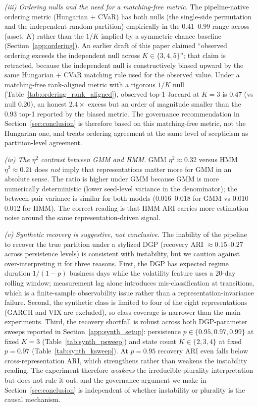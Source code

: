 \documentclass[preprint,12pt,authoryear]{elsarticle}
\begin{document}
\emph{(iii) Ordering nulls and the need for a matching-free metric.} The pipeline-native ordering metric (Hungarian + CVaR) has both nulls (the single-side permutation and the independent-random-partition) empirically in the $0.41$--$0.99$ range across (asset, $K$) rather than the $1/K$ implied by a symmetric chance baseline (Section~\ref{app:ordering}). An earlier draft of this paper claimed ``observed ordering exceeds the independent null across $K\in\{3,4,5\}$''; that claim is retracted, because the independent null is constructively biased upward by the same Hungarian + CVaR matching rule used for the observed value. Under a matching-free rank-aligned metric with a rigorous $1/K$ null (Table~\ref{tab:ordering_rank_aligned}), observed top-1 Jaccard at $K=3$ is $0.47$ (vs null $0.20$), an honest $2.4\times$ excess but an order of magnitude smaller than the $0.93$ top-1 reported by the biased metric. The governance recommendation in Section~\ref{sec:conclusion} is therefore based on this matching-free metric, not the Hungarian one, and treats ordering agreement at the same level of scepticism as partition-level agreement.

\emph{(iv) The $\eta^2$ contrast between GMM and HMM.} GMM $\eta^2 \approx 0.32$ versus HMM $\eta^2 \approx 0.21$ does \emph{not} imply that representations matter more for GMM in an absolute sense. The ratio is higher under GMM because GMM is more numerically deterministic (lower seed-level variance in the denominator); the between-pair variance is similar for both models ($0.016$--$0.018$ for GMM vs $0.010$--$0.012$ for HMM). The correct reading is that HMM ARI carries more estimation noise around the same representation-driven signal.

\emph{(v) Synthetic recovery is \emph{suggestive}, not conclusive.} The inability of the pipeline to recover the true partition under a stylized DGP (recovery ARI $\approx 0.15$--$0.27$ across persistence levels) is consistent with instability, but we caution against over-interpreting it for three reasons. First, the DGP has expected regime duration $1/(1{-}p)$ business days while the volatility feature uses a 20-day rolling window; measurement lag alone introduces mis-classification at transitions, which is a finite-sample observability issue rather than a representation-invariance failure. Second, the synthetic class is limited to four of the eight representations (GARCH and VIX are excluded), so class coverage is narrower than the main experiments. Third, the recovery shortfall is robust across both DGP-parameter sweeps reported in Section~\ref{app:synth_setup}: persistence $p \in \{0.95, 0.97, 0.99\}$ at fixed $K=3$ (Table~\ref{tab:synth_psweep}) and state count $K \in \{2, 3, 4\}$ at fixed $p=0.97$ (Table~\ref{tab:synth_ksweep}). At $p=0.95$ recovery ARI even falls below cross-representation ARI, which strengthens rather than weakens the instability reading. The experiment therefore \emph{weakens} the irreducible-plurality interpretation but does not rule it out, and the governance argument we make in Section~\ref{sec:conclusion} is independent of whether instability or plurality is the causal mechanism.
\end{document}
